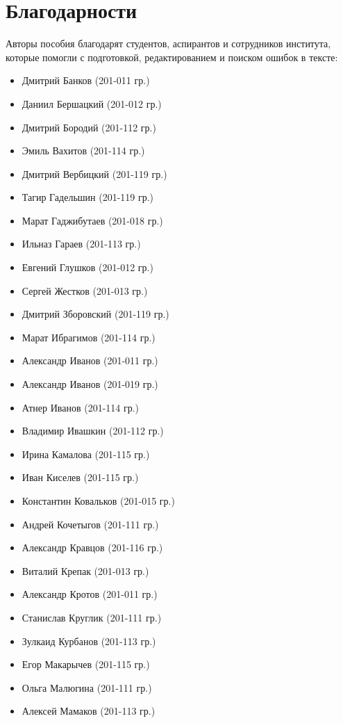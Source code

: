 \section*{Благодарности}
Авторы пособия благодарят студентов, аспирантов и сотрудников института, которые помогли с подготовкой, редактированием и поиском ошибок в тексте:

\begin{itemize}
	\item Дмитрий Банков (201-011 гр.)
	\item Даниил Бершацкий (201-012 гр.)
	\item Дмитрий Бородий (201-112 гр.)
	\item Эмиль Вахитов (201-114 гр.)
	\item Дмитрий Вербицкий (201-119 гр.)
	\item Тагир Гадельшин (201-119 гр.)
	\item Марат Гаджибутаев (201-018 гр.)
	\item Ильназ Гараев (201-113 гр.)
	\item Евгений Глушков (201-012 гр.)
	\item Сергей Жестков (201-013 гр.)
	\item Дмитрий Зборовский (201-119 гр.)
	\item Марат Ибрагимов (201-114 гр.)
	\item Александр Иванов (201-011 гр.)
	\item Александр Иванов (201-019 гр.)
	\item Атнер Иванов (201-114 гр.)
	\item Владимир Ивашкин (201-112 гр.)
	\item Ирина Камалова (201-115 гр.)
	\item Иван Киселев (201-115 гр.)
	\item Константин Ковальков (201-015 гр.)
	\item Андрей Кочетыгов (201-111 гр.)
	\item Александр Кравцов (201-116 гр.)
	\item Виталий Крепак (201-013 гр.)
	\item Александр Кротов (201-011 гр.)
	\item Станислав Круглик (201-111 гр.)
	\item Зулкаид Курбанов (201-113 гр.)
	\item Егор Макарычев (201-115 гр.)
	\item Ольга Малюгина (201-111 гр.)
	\item Алексей Мамаков (201-113 гр.)

\end{itemize}
